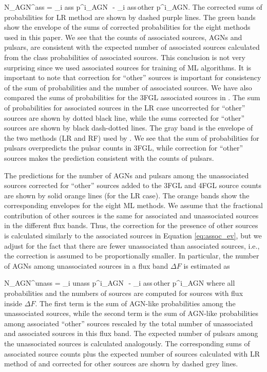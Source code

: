 \be
{}
N_{\rm AGN}^{\rm ass}  = \sum_{i \in \rm ass} p^i_{\rm AGN}\,\, - \sum_{i \in \rm ass\,other} p^i_{\rm AGN}.
\ee
The corrected sums of probabilities for LR method are shown by dashed purple lines.
The green bands show the envelope of the sums of corrected probabilities for the eight methods used in this paper.
We see that the counts of associated sources, AGNs and pulsars, are consistent with the expected number of associated sources
calculated from the class probabilities of associated sources.
This conclusion is not very surprising since we used associated sources for training of ML algorithms.
It is important to note that correction for ``other'' sources is important for consistency of the sum of probabilities and the number of associated sources.
We have also compared the sums of probabilities for the 3FGL associated sources in \cite{2016ApJ...820....8S}.
The sum of probabilities for associated sources in the LR case uncorrected for ``other'' sources are shown by dotted black line,
while the sums corrected for ``other'' sources are shown by black dash-dotted lines.
The gray band is the envelope of the two methods (LR and RF) used by \cite{2016ApJ...820....8S}.
We see that the sum of probabilities for pulsars overpredicts the pulsar counts in 3FGL, 
while correction for ``other'' sources makes the prediction consistent with the counts of pulsars.

The predictions for the number of AGNs and pulsars among the unassociated sources corrected for ``other'' sources 
added to the 3FGL and 4FGL source counts are shown by solid orange lines (for the LR case).
The orange bands show the corresponding envelopes for the eight ML methods.
We assume that the fractional contribution of other sources is the same for associated and unassociated sources in the different flux bands.
Thus, the correction for the presence of other sources is calculated similarly to the associated sources in Equation \ref{eq:assoc_ev},
but we adjust for the fact that there are fewer unassociated than associated sources, i.e., 
the correction is assumed to be proportionally smaller.
In particular, the number of AGNs among unassociated sources in a flux band $\Delta F$ is estimated as

\be
{}
N_{\rm AGN}^{\rm unass} = \sum_{i \in \rm unass} p^i_{\rm AGN}\,\, - \sum_{i \in \rm ass\,other} p^i_{\rm AGN} \cdot 
{}
\ee
where all probabilities and the numbers of sources are computed for sources with flux inside $\Delta F$.
The first term is the sum of AGN-like probabilities among the unassociated sources,
while the second term is the sum of AGN-like probabilities among associated ``other'' sources rescaled by the total number
of unassociated and associated sources in this flux band.
The expected number of pulsars among the unassociated sources is calculated analogously.
The corresponding sums of associated source counts plus the expected number of sources calculated with LR method of \cite{2016ApJ...820....8S} 
and corrected for other sources are shown by dashed grey lines.


